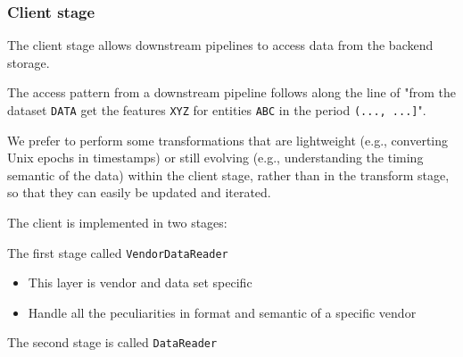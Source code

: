 \documentclass[11pt, reqno]{amsart}
\theoremstyle{definition}
\theoremstyle{remark}
\begin{document}
\subsubsection{Client stage}

The client stage allows downstream pipelines to access data from the backend
storage.

The access pattern from a downstream pipeline follows along the line of
"from the dataset \verb|DATA|
get the features \verb|XYZ|
for entities \verb|ABC|
in the period \verb|(..., ...]|".

We prefer to perform some transformations that are lightweight (e.g., converting
Unix epochs in timestamps) or still evolving (e.g., understanding the timing
semantic of the data) within the client stage, rather than in the transform stage,
so that they can easily be updated and iterated.

The client is implemented in two stages:

The first stage called \verb|VendorDataReader|
\begin{itemize}
  \item This layer is vendor and data set specific
  \item Handle all the peculiarities in format and semantic of a specific
        vendor
\end{itemize}

The second stage is called \verb|DataReader|
\end{document}
